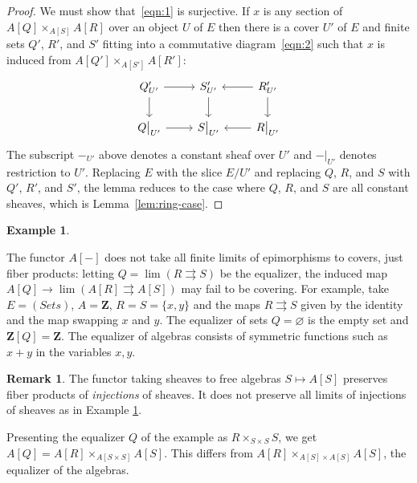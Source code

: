 \documentclass[11pt,reqno]{amsart}
\theoremstyle{definition}
\newtheorem{example}[theorem]{Example}
\newtheorem{remark}[theorem]{Remark}
\newcommand{\ZZ}{\mathbf{Z}}
\begin{document}
\begin{proof}
	We must show that~\eqref{eqn:1} is surjective.  If $x$ is any section of $A[Q] \mathop\times_{A[S]} A[R]$ over an object $U$ of $E$ then there is a cover $U'$ of $E$ and finite sets $Q'$, $R'$, and $S'$ fitting into a commutative diagram~\eqref{eqn:2} such that $x$ is induced from $A[Q'] \mathop\times_{A[S']} A[R']$:
	\begin{equation} \begin{tikzcd}
		\label{eqn:2}
		Q'_{U'} \ar[r] \ar[d] & S'_{U'} \ar[d] & R'_{U'} \ar[l] \ar[d] \\
		Q \big|_{U'} \ar[r] & S \big|_{U'} & R \big|_{U'} \ar[l]
	\end{tikzcd}
	\end{equation}
	The subscript ${-}_{U'}$ above denotes a constant sheaf over $U'$ and $-\big|_{U'}$ denotes restriction to $U'$.  Replacing $E$ with the slice $E/U'$ and replacing $Q$, $R$, and $S$ with $Q'$, $R'$, and $S'$, the lemma reduces to the case where $Q$, $R$, and $S$ are all constant sheaves, which is Lemma~\ref{lem:ring-case}.
\end{proof}




\begin{example}\label{ex:freealgequalizers}

The functor $A[-]$ does not take all finite limits of epimorphisms to covers, just fiber products: letting $Q = \lim (R \rightrightarrows S)$ be the equalizer, the induced map $A[Q] \to \lim (A[R] \rightrightarrows A[S])$ may fail to be covering. For example, take $E = (\mathit{Sets})$, $A = \ZZ$, $R = S = \{x, y\}$ and the maps $R \rightrightarrows S$ given by the identity and the map swapping $x$ and $y$. The equalizer of sets $Q = \varnothing$ is the empty set and $\ZZ[Q] = \ZZ$. The equalizer of algebras consists of symmetric functions such as $x + y$ in the variables $x, y$. 

\end{example}




\begin{remark}

The functor taking sheaves to free algebras $S \mapsto A[S]$ preserves fiber products of \emph{injections} of sheaves. It does not preserve all limits of injections of sheaves as in Example \ref{ex:freealgequalizers}. 

Presenting the equalizer $Q$ of the example as $R \times_{S \times S} S$, we get $A[Q] = A[R] \times_{A[S \times S]} A[S]$. This differs from $A[R] \times_{A[S] \times A[S]} A[S]$, the equalizer of the algebras. 

\end{remark}
\end{document}
